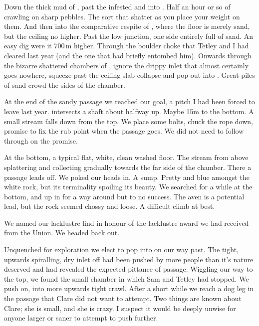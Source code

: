 Down the thick mud of , past the infested  and into . Half an hour or so of crawling on sharp pebbles. The sort that shatter as you place your weight on them. And then into the comparative respite of , where the floor is merely sand, but the ceiling no higher. Past the low junction, one side entirely full of sand. An easy dig were it 700\,m higher. Through the boulder choke that Tetley and I had cleared last year (and the one that had briefly entombed him). Onwards through the bizarre shattered chambers of , ignore the drippy inlet that almost certainly goes nowhere, squeeze past the ceiling slab collapse and pop out into . Great piles of sand crowd the sides of the chamber.

At the end of the sandy passage we reached our goal, a pitch I had been forced to leave last year.  intersects a shaft about halfway up. Maybe 15m to the bottom. A small stream falls down from the top. We place some bolts, chuck the rope down, promise to fix the rub point when the passage goes. We did not need to follow through on the promise. 

At the bottom, a typical flat, white, clean washed floor. The stream from above splattering and collecting gradually towards the far side of the chamber. There a passage leads off. We poked our heads in. A sump. Pretty and blue amongst the white rock, but its terminality spoiling its beauty. We searched for a while at the bottom, and up in  for a way around but to no success. The aven is a potential lead, but the rock seemed chossy and loose. A difficult climb at best.

We named our lacklustre find  in honour of the lacklustre award we had received from the Union. We headed back out. 

Unquenched for exploration we elect to pop into  on our way past. The tight, upwards spiralling, dry inlet off  had been pushed by more people than it's nature deserved and had revealed the expected pittance of passage. Wiggling our way to the top, we found the small chamber in which Sam and Tetley had stopped. We push on, into more upwards tight crawl. After a short while we reach a dog leg in the passage that Clare did not want to attempt. Two things are known about Clare; she is small, and she is crazy. I suspect it would be deeply unwise for anyone larger or saner to attempt to push further. 

